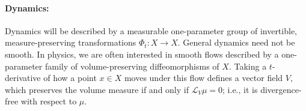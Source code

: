 \documentclass[a4paper,11pt]{article}
\theoremstyle{definition}
\newcommand{\E}{\mathbb{E}}
\newcommand{\mA}{\mathcal{A}}
\newcommand{\mH}{\mathcal{H}}
\begin{document}
\paragraph{Dynamics:} Dynamics will be described by a measurable one-parameter group of invertible, measure-preserving transformations $\Phi_t:X\to X$. General dynamics need not be smooth. In physics, we are often interested in smooth flows described by a one-parameter family of volume-preserving diffeomorphisms of $X$. Taking a $t$-derivative of how a point $x\in X$ moves under this flow defines a vector field $V$, which preserves the volume measure if and only if $\mathcal{L}_V\mu=0$; i.e., it is divergence-free with respect to $\mu$. 





\end{document}
